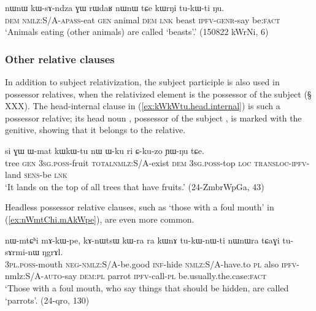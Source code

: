 \begin{exe}
\ex \label{ex:kWsAndza.GW}
 \gll nɯnɯ kɯ-sɤ-ndza ɣɯ rɯdaʁ nɯnɯ tɕe kɯrŋi tu-kɯ-ti ŋu.  \\
 \textsc{dem} \textsc{nmlz}:S/A-\textsc{apass}-eat \textsc{gen} animal \textsc{dem} \textsc{lnk} beast \textsc{ipfv}-\textsc{genr}-say be:\textsc{fact} \\
 \glt `Animals eating (other animals) are called `beasts'.' (150822 kWrNi, 6)
\end{exe}

\subsubsection{Other relative clauses}  \label{ex:subject.participle.other.relative}
In addition to subject relativization, the subject participle is also used in possessor relatives, when the relativized element is the possessor of the subject (§ XXX).  The head-internal clause in (\ref{ex:kWkWtu.head.internal}) is such a possessor relative; its head noun , possessor of the subject ,  is marked with the genitive, showing that it belongs to the relative.  

\begin{exe}
\ex \label{ex:kWkWtu.head.internal}
 \gll si ɣɯ ɯ-mat kɯ\redp{}kɯ-tu nɯ ɯ-ku ri ɕ-ku-zo ɲɯ-ŋu tɕe. \\
 tree \textsc{gen} \textsc{3sg}.\textsc{poss}-fruit \textsc{total}\redp{}\textsc{nmlz}:S/A-exist \textsc{dem} \textsc{3sg}.\textsc{poss}-top \textsc{loc} \textsc{transloc}-\textsc{ipfv}-land \textsc{sens}-be \textsc{lnk} \\
 \glt `It lands on the top of all trees that have fruits.' (24-ZmbrWpGa, 43)
\end{exe}

 Headless possessor relative clauses, such as   `those with a foul mouth' in (\ref{ex:nWmtChi.mAkWpe}), are even more common.

\begin{exe}
\ex \label{ex:nWmtChi.mAkWpe}
 \gll nɯ-mtɕʰi mɤ-kɯ-pe, kɤ-nɯtsɯ kɯ-ra ra kɯnɤ tu-kɯ-nɯ-ti nɯnɯra tɕaɣi tu-sɤrmi-nɯ ŋgrɤl. \\
 \textsc{3pl}.\textsc{poss}-mouth \textsc{neg}-\textsc{nmlz}:S/A-be.good \textsc{inf}-hide \textsc{nmlz}:S/A-have.to \textsc{pl} also \textsc{ipfv}-nmlz:S/A-\textsc{auto}-say \textsc{dem}:\textsc{pl} parrot \textsc{ipfv}-call-\textsc{pl} be.usually.the.case:\textsc{fact} \\
 \glt `Those with a foul mouth, who say things that should be hidden, are called `parrots'. (24-qro, 130)
\end{exe}


